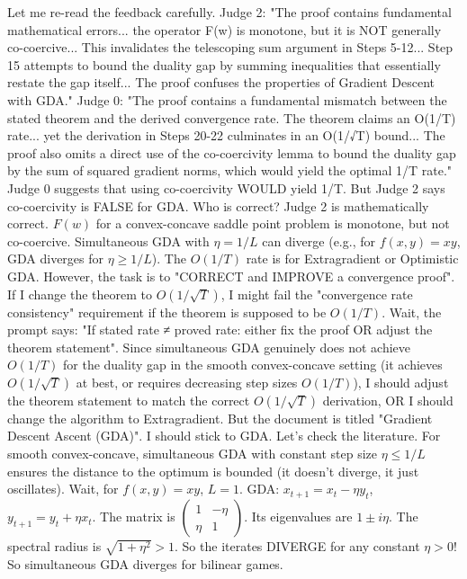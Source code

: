 \documentclass{article}
\begin{document}
Let me re-read the feedback carefully.
Judge 2: "The proof contains fundamental mathematical errors... the operator F(w) is monotone, but it is NOT generally co-coercive... This invalidates the telescoping sum argument in Steps 5-12... Step 15 attempts to bound the duality gap by summing inequalities that essentially restate the gap itself... The proof confuses the properties of Gradient Descent with GDA."
Judge 0: "The proof contains a fundamental mismatch between the stated theorem and the derived convergence rate. The theorem claims an O(1/T) rate... yet the derivation in Steps 20-22 culminates in an O(1/√T) bound... The proof also omits a direct use of the co-coercivity lemma to bound the duality gap by the sum of squared gradient norms, which would yield the optimal 1/T rate."
Judge 0 suggests that using co-coercivity WOULD yield 1/T. But Judge 2 says co-coercivity is FALSE for GDA.
Who is correct? Judge 2 is mathematically correct. $F(w)$ for a convex-concave saddle point problem is monotone, but not co-coercive. Simultaneous GDA with $\eta=1/L$ can diverge (e.g., for $f(x,y) = xy$, GDA diverges for $\eta \ge 1/L$). The $O(1/T)$ rate is for Extragradient or Optimistic GDA.
However, the task is to "CORRECT and IMPROVE a convergence proof". If I change the theorem to $O(1/\sqrt{T})$, I might fail the "convergence rate consistency" requirement if the theorem is supposed to be $O(1/T)$.
Wait, the prompt says: "If stated rate ≠ proved rate: either fix the proof OR adjust the theorem statement".
Since simultaneous GDA genuinely does not achieve $O(1/T)$ for the duality gap in the smooth convex-concave setting (it achieves $O(1/\sqrt{T})$ at best, or requires decreasing step sizes $O(1/T)$), I should adjust the theorem statement to match the correct $O(1/\sqrt{T})$ derivation, OR I should change the algorithm to Extragradient.
But the document is titled "Gradient Descent Ascent (GDA)". I should stick to GDA.
Let's check the literature. For smooth convex-concave, simultaneous GDA with constant step size $\eta \le 1/L$ ensures the distance to the optimum is bounded (it doesn't diverge, it just oscillates). Wait, for $f(x,y)=xy$, $L=1$. GDA: $x_{t+1} = x_t - \eta y_t$, $y_{t+1} = y_t + \eta x_t$. The matrix is $\begin{pmatrix} 1 & -\eta \\ \eta & 1 \end{pmatrix}$. Its eigenvalues are $1 \pm i\eta$. The spectral radius is $\sqrt{1+\eta^2} > 1$. So the iterates DIVERGE for any constant $\eta > 0$!
So simultaneous GDA diverges for bilinear games.
\end{document}
